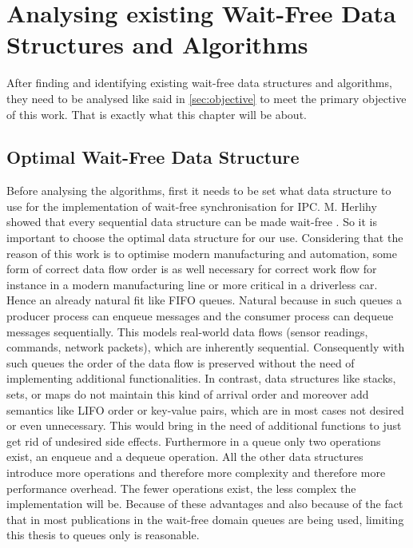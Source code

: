 \chapter{Analysing existing Wait-Free Data Structures and Algorithms}\label{ch:choosing-the-optimal-wait-free-data-structure}
After finding and identifying existing wait-free data structures and algorithms, they need to be analysed like said in \cref{sec:objective} to meet the primary objective of this work. That is exactly what this chapter will be about.

\section{Optimal Wait-Free Data Structure}\label{sec:optimal-wait-free-data-structure}
Before analysing the algorithms, first it needs to be set what data structure to use for the implementation of wait-free synchronisation for \ac{IPC}. M. Herlihy showed that every sequential data structure can be made wait-free \cite{herlihy1991wait}. So it is important to choose the optimal data structure for our use. Considering that the reason of this work is to optimise modern manufacturing and automation, some form of correct data flow order is as well necessary for correct work flow for instance in a modern manufacturing line or more critical in a driverless car. Hence an already natural fit like \ac{FIFO} queues. Natural because in such queues a producer process can enqueue messages and the consumer process can dequeue messages sequentially. This models real-world data flows (sensor readings, commands, network packets), which are inherently sequential. Consequently with such queues the order of the data flow is preserved without the need of implementing additional functionalities. In contrast, data structures like stacks, sets, or maps do not maintain this kind of arrival order and moreover add semantics like \ac{LIFO} order or key-value pairs, which are in most cases not desired or even unnecessary. This would bring in the need of additional functions to just get rid of undesired side effects. Furthermore in a queue only two operations exist, an enqueue and a dequeue operation. All the other data structures introduce more operations and therefore more complexity and therefore more performance overhead. The fewer operations exist, the less complex the implementation will be. Because of these advantages and also because of the fact that in most publications in the wait-free domain queues are being used, limiting this thesis to queues only is reasonable. \cite{jiffy}

